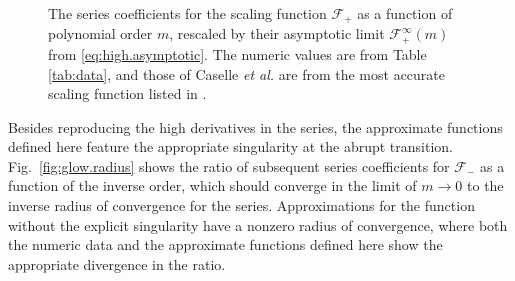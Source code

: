 \documentclass[
aps,
pre,
preprint,
longbibliography,
floatfix
]{revtex4-2}
\begin{document}
\begin{figure}
  \caption{
    The series coefficients for the scaling function $\mathcal F_+$ as a
    function of polynomial order $m$, rescaled by their asymptotic limit
    $\mathcal F_+^\infty(m)$ from \eqref{eq:high.asymptotic}. The numeric
    values are from Table \ref{tab:data}, and those of Caselle \textit{et al.}
    are from the most accurate scaling function listed in \cite{Caselle_2001_The}.
  } \label{fig:ghigh.series.scaled}
\end{figure}

Besides reproducing the high derivatives in the series, the approximate
functions defined here feature the appropriate singularity at the abrupt
transition. Fig.~\ref{fig:glow.radius} shows the ratio of subsequent series
coefficients for $\mathcal F_-$ as a function of the inverse order, which
should converge in the limit of $m\to0$ to the inverse radius of convergence
for the series. Approximations for the function without the explicit
singularity have a nonzero radius of convergence, where both the numeric data
and the approximate functions defined here show the appropriate divergence in
the ratio.
\end{document}
